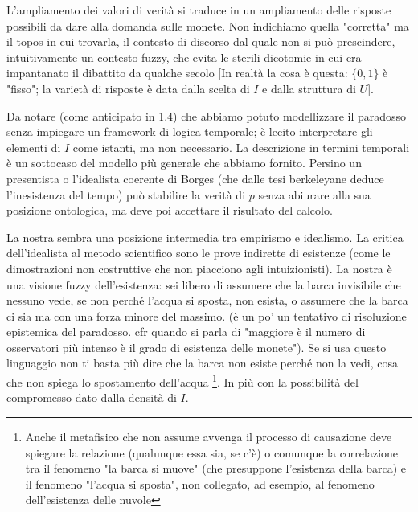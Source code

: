 L'ampliamento dei valori di verità si traduce in un ampliamento delle risposte possibili da dare alla domanda sulle monete. Non indichiamo quella "corretta" ma il topos in cui trovarla, il contesto di discorso dal quale non si può prescindere, intuitivamente un contesto fuzzy, che evita le sterili dicotomie in cui era impantanato il dibattito da qualche secolo [In realtà la cosa è questa: $\{0,1\}$ è "fisso"; la varietà di risposte è data dalla scelta di $I$ e dalla struttura di $U$].

Da notare (come anticipato in 1.4) che abbiamo potuto modellizzare il paradosso senza impiegare un framework di logica temporale; è lecito interpretare gli elementi di $I$ come istanti, ma non necessario. La descrizione in termini temporali è un sottocaso del modello più generale che abbiamo fornito. Persino un presentista o l'idealista coerente di Borges (che dalle tesi berkeleyane deduce l'inesistenza del tempo) può stabilire la verità di $p$ senza abiurare alla sua posizione ontologica, ma deve poi accettare il risultato del calcolo. 


La nostra sembra una posizione intermedia tra empirismo e idealismo. La critica dell'idealista al metodo scientifico sono le prove indirette di esistenze (come le dimostrazioni non costruttive che non piacciono agli intuizionisti). La nostra è una visione fuzzy dell'esistenza: sei libero di assumere che la barca invisibile che nessuno vede, se non perché l'acqua si sposta, non esista, o assumere che la barca ci sia ma con una forza minore del massimo. (è un po' un tentativo di risoluzione epistemica del paradosso. cfr quando si parla di "maggiore è il numero di osservatori più intenso è il grado di esistenza delle monete"). Se si usa questo linguaggio non ti basta più dire che la barca non esiste perché non la vedi, cosa che non spiega lo spostamento dell'acqua \footnote{Anche il metafisico che non assume avvenga il processo di causazione deve spiegare la relazione (qualunque essa sia, se c'è) o comunque la correlazione tra il fenomeno "la barca si muove" (che presuppone l'esistenza della barca) e il fenomeno "l'acqua si sposta", non collegato, ad esempio, al fenomeno dell'esistenza delle nuvole}. In più con la possibilità del compromesso dato dalla densità di $I$.


